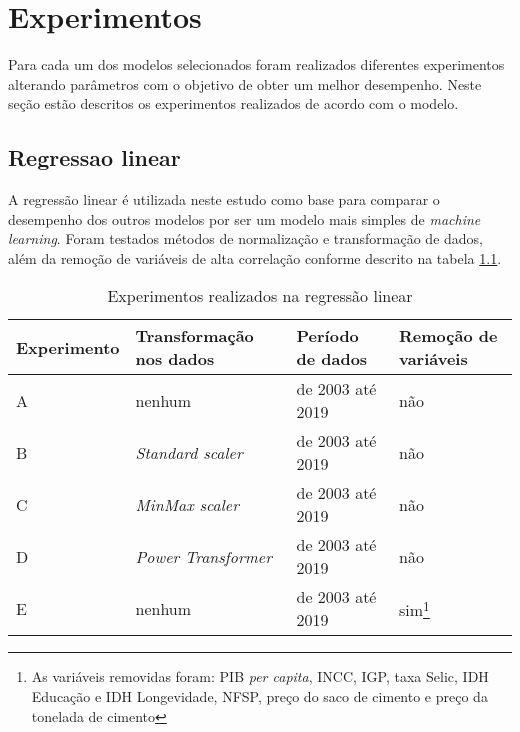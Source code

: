 
\chapter{Experimentos}
\label{chap:experimentos}

Para cada um dos modelos selecionados foram realizados diferentes experimentos
alterando parâmetros com o objetivo de obter um melhor 
desempenho. Neste seção estão descritos os experimentos realizados de acordo 
com o modelo.


\section{Regressao linear}

A regressão linear é utilizada 
neste estudo como base para comparar o desempenho dos
outros modelos por ser um modelo mais simples de \textit{machine learning}. 
Foram testados métodos de normalização  e transformação de 
dados, além da 
remoção de variáveis de alta correlação conforme 
descrito na tabela \ref{tab:exp-reg-lin}. 

\begin{table}
    \centering
    \caption{Experimentos realizados na regressão linear}
    \begin{tabular}{llll}
        \toprule
        Experimento & Transformação nos dados     & Período de dados & Remoção de variáveis  \\
        \midrule
        A           & nenhum & de 2003 até 2019            & não~                                     \\
        B           & \textit{Standard scaler}~            & de 2003 até 2019            & não~ ~                                   \\
        C           & \textit{MinMax scaler}~ ~            & de 2003 até 2019            & não~ ~ ~                                 \\
        D           & \textit{Power Transformer}           & de 2003 até 2019            & não                                      \\
        E           & nenhum & de 2003 até 2019            & sim\footnote{As variáveis removidas foram: PIB \textit{per capita}, INCC, IGP, taxa Selic, IDH Educação e IDH Longevidade, 
        NFSP, preço do saco de cimento e preço da tonelada de cimento}                                      \\
        \bottomrule
    \end{tabular}
    \label{tab:exp-reg-lin}
\end{table}

